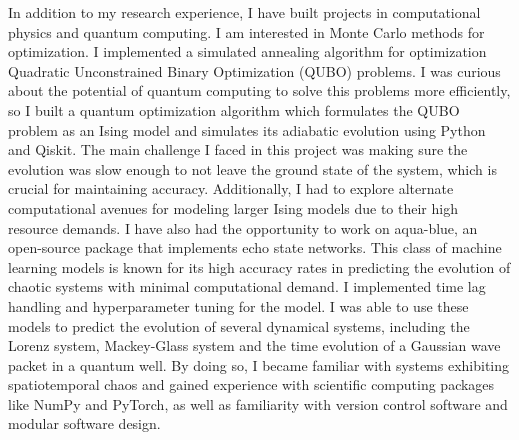 \documentclass{article}
\begin{document}
In addition to my research experience, I have built projects in computational physics and quantum computing.
I am interested in Monte Carlo methods for optimization. I implemented a simulated annealing 
algorithm for optimization Quadratic Unconstrained Binary Optimization (QUBO) problems. I was curious 
about the potential of quantum computing to solve this problems more efficiently, 
so I built a quantum optimization algorithm which formulates the QUBO problem as an Ising model and 
simulates its adiabatic evolution using Python and Qiskit. The main challenge I faced in this project was making sure the evolution was slow enough to not leave the ground state of the 
system, which is crucial for maintaining accuracy. Additionally, I had to explore alternate computational avenues 
for modeling larger Ising models due to their high resource demands.
I have also had the opportunity to work on aqua-blue, an open-source package that implements echo state networks. 
This class of machine learning models is known for its high accuracy rates in predicting the evolution of chaotic systems 
with minimal computational demand. I implemented time lag handling and hyperparameter tuning for the model. 
I was able to use these models to predict the evolution of several dynamical systems, including the 
Lorenz system, Mackey-Glass system and the time evolution of a Gaussian wave packet in a quantum well.
By doing so, I became familiar with systems exhibiting spatiotemporal chaos and gained experience with scientific computing packages like NumPy and PyTorch,
as well as familiarity with version control software and modular software design. 
\end{document}
